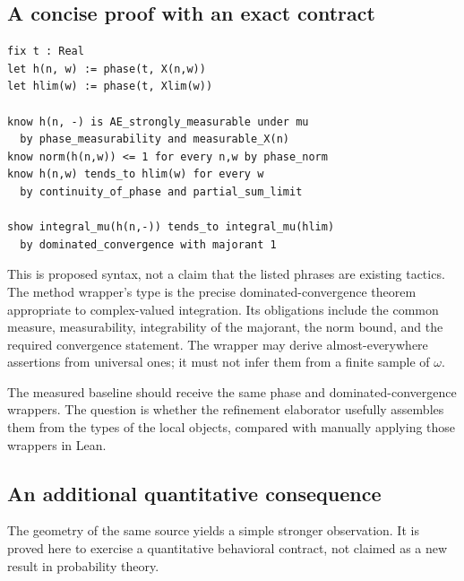 \documentclass[11pt,letterpaper]{article}
\theoremstyle{definition}\newtheorem{definition}[theorem]{Definition}
\begin{document}
\subsection{A concise proof with an exact contract}
\begin{lstlisting}
fix t : Real
let h(n, w) := phase(t, X(n,w))
let hlim(w) := phase(t, Xlim(w))

know h(n, -) is AE_strongly_measurable under mu
  by phase_measurability and measurable_X(n)
know norm(h(n,w)) <= 1 for every n,w by phase_norm
know h(n,w) tends_to hlim(w) for every w
  by continuity_of_phase and partial_sum_limit

show integral_mu(h(n,-)) tends_to integral_mu(hlim)
  by dominated_convergence with majorant 1
\end{lstlisting}
This is proposed syntax, not a claim that the listed phrases are existing tactics. The method wrapper's type is the precise dominated-convergence theorem appropriate to complex-valued integration. Its obligations include the common measure, measurability, integrability of the majorant, the norm bound, and the required convergence statement. The wrapper may derive almost-everywhere assertions from universal ones; it must not infer them from a finite sample of $\omega$.

The measured baseline should receive the same phase and dominated-convergence wrappers. The question is whether the refinement elaborator usefully assembles them from the types of the local objects, compared with manually applying those wrappers in Lean.

\subsection{An additional quantitative consequence}
The geometry of the same source yields a simple stronger observation. It is proved here to exercise a quantitative behavioral contract, not claimed as a new result in probability theory.
\end{document}
